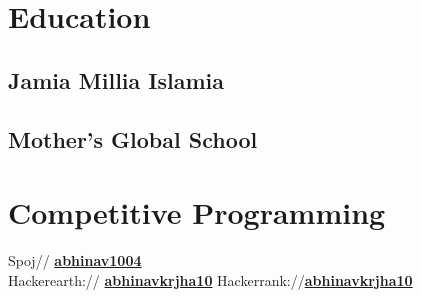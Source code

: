 \documentclass[]{deedy-resume-openfont}
\begin{document}
%
%
\lastupdated

%
%

%
%

\begin{minipage}[t]{0.33\textwidth}


\section{Education}

\subsection{Jamia Millia Islamia}
\sectionsep

\subsection{Mother's Global School}
\sectionsep


\section{Competitive Programming}

Spoj//  \href{https://www.spoj.com/users/abhinav_1004/}{\bf abhinav1004} \\
Hackerearth://  \href{https://www.hackerearth.com/@abhinavkrjha10}{\bf abhinavkrjha10}
Hackerrank://\href{https://www.hackerrank.com/abhinavkrjha10}{\bf abhinavkrjha10}


\end{minipage}
\end{document}
